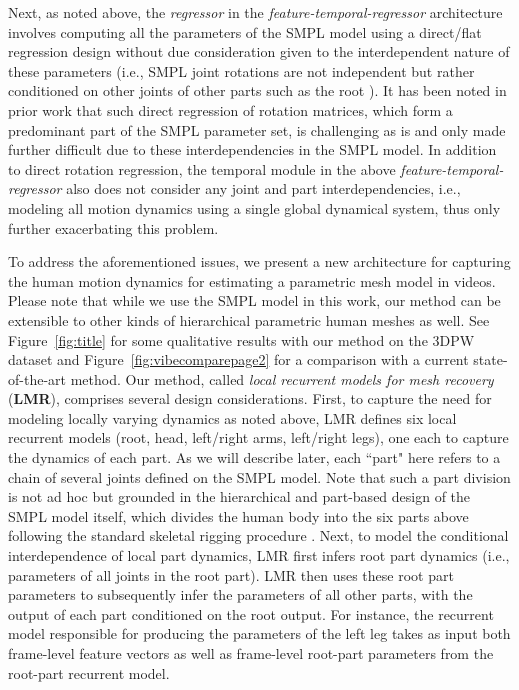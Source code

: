 \documentclass[10pt,twocolumn,letterpaper]{article}
\begin{document}
Next, as noted above, the \textsl{regressor} in the \textsl{feature-temporal-regressor} architecture involves computing all the parameters of the SMPL model using a direct/flat regression design without due consideration given to the interdependent nature of these parameters (i.e., SMPL joint rotations are not independent but rather conditioned on other joints of other parts such as the root \cite{loper2015smpl}). It has been noted in prior work \cite{kendall2017geometric} that such direct regression of rotation matrices, which form a predominant part of the SMPL parameter set, is challenging as is and only made further difficult due to these interdependencies in the SMPL model. In addition to direct rotation regression, the temporal module in the above \textsl{feature-temporal-regressor} also does not consider any joint and part interdependencies, i.e., modeling all motion dynamics using a single global dynamical system, thus only further exacerbating this problem. 

To address the aforementioned issues, we present a new architecture for capturing the human motion dynamics for estimating a parametric mesh model in videos. Please note that while we use the SMPL model \cite{loper2015smpl} in this work, our method can be extensible to other kinds of hierarchical parametric human meshes as well. See Figure~\ref{fig:title} for some qualitative results with our method on the 3DPW \cite{von2018recovering} dataset and Figure~\ref{fig:vibecomparepage2} for a comparison with a current state-of-the-art method. Our method, called \textsl{local recurrent models for mesh recovery} (\textbf{LMR}), comprises several design considerations. First, to capture the need for modeling locally varying dynamics as noted above, LMR defines six local recurrent models (root, head, left/right arms, left/right legs), one each to capture the dynamics of each part. As we will describe later, each ``part" here refers to a chain of several joints defined on the SMPL model. Note that such a part division is not ad hoc but grounded in the hierarchical and part-based design of the SMPL model itself, which divides the human body into the six parts above following the standard skeletal rigging procedure \cite{loper2015smpl}. Next, to model the conditional interdependence of local part dynamics, LMR first infers root part dynamics (i.e., parameters of all joints in the root part). LMR then uses these root part parameters to subsequently infer the parameters of all other parts, with the output of each part conditioned on the root output. For instance, the recurrent model responsible for producing the parameters of the left leg takes as input both frame-level feature vectors as well as frame-level root-part parameters from the root-part recurrent model.
\end{document}

